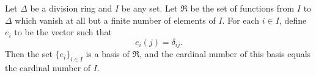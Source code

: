 Let $\Delta$ be a division ring and $I$ be any set. Let $\Re$ be the set of functions from $I$ to $\Delta$ which vanish at all but a finite number of elements of $I$. For each $i \in I$, define $e_i$ to be the vector such that
$$e_i(j) = \delta_{ij}.$$
Then the set $\{e_i\}_{i \in I}$ is a basis of $\Re$, and the cardinal number of this basis equals the cardinal number of $I$.
